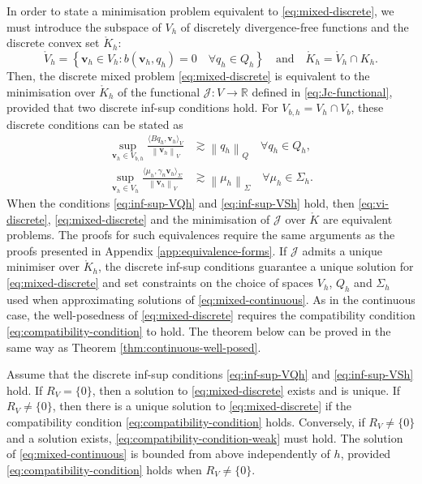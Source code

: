 \documentclass[onefignum,onetabnum]{siamart190516}
\newcommand{\RR}{\mathbb{R}}
\newcommand{\bv}{\boldsymbol{v}}
\newcommand{\nrm}[1]{\left\lVert#1\right\rVert}
\newcommand{\Vo}{\mathring{V}}
\newcommand{\Ko}{\mathring{K}}
\newcommand{\Jc}{\mathcal{J}}
\begin{document}
In order to state a minimisation problem equivalent to \eqref{eq:mixed-discrete}, we must introduce the subspace of $V_h$ of discretely divergence-free functions and the discrete convex set $\Ko_h$:
%
\[
	\Vo_h = \left\lbrace \bv_h \in V_h : b(\bv_h,q_h) = 0 \quad \forall q_h\in Q_h \right\rbrace \quad \text{and} \quad \Ko_h = \Vo_h \cap K_h.
\]
%
Then, the discrete mixed problem \eqref{eq:mixed-discrete} is equivalent to the minimisation over $\Ko_h$ of the functional $\Jc:V \to \RR$ defined in \eqref{eq:Jc-functional}, provided that two discrete inf-sup conditions hold. For $V_{b,h} = V_h \cap V_b$, these discrete conditions can be stated as 
%
\begin{align}
	\sup_{\bv_h\in V_{b,h}} \frac{\langle Bq_h, \bv_h\rangle_V}{\nrm{\bv_h}_V} & \gtrsim \nrm{q_h}_Q \quad \forall q_h\in Q_h, \label{eq:inf-sup-VQh}\\
	\sup_{\bv_h\in V_{h}} \frac{\langle \mu_h, \gamma_n\bv_h\rangle_\Sigma}{\nrm{\bv_h}_V} &\gtrsim \nrm{\mu_h}_\Sigma \quad \forall \mu_h\in \Sigma_h. \label{eq:inf-sup-VSh}
\end{align}
%
When the conditions \eqref{eq:inf-sup-VQh} and \eqref{eq:inf-sup-VSh} hold, then \eqref{eq:vi-discrete}, \eqref{eq:mixed-discrete} and the minimisation of $\Jc$ over $\Ko$ are equivalent problems. The proofs for such equivalences require the same arguments as the proofs presented in Appendix \ref{app:equivalence-forms}. If $\Jc$ admits a unique minimiser over $\Ko_h$, the discrete inf-sup conditions guarantee a unique solution for \eqref{eq:mixed-discrete} and set constraints on the choice of spaces $V_h$, $Q_h$ and $\Sigma_h$ used when approximating solutions of \eqref{eq:mixed-continuous}. As in the continuous case, the well-posedness of \eqref{eq:mixed-discrete} requires the compatibility condition \eqref{eq:compatibility-condition} to hold. The theorem below can be proved in the same way as Theorem \ref{thm:continuous-well-posed}.

\begin{theorem}\label{thm:discrete-well-posed}
	Assume that the discrete inf-sup conditions \eqref{eq:inf-sup-VQh} and \eqref{eq:inf-sup-VSh} hold. If $R_V = \{0\}$, then a solution to \eqref{eq:mixed-discrete} exists and is unique. If $R_V \neq \{0\}$, then there is a unique solution to \eqref{eq:mixed-discrete} if the compatibility condition \eqref{eq:compatibility-condition} holds. Conversely, if $R_V \neq \{0\}$ and a solution exists, \eqref{eq:compatibility-condition-weak} must hold. The solution of \eqref{eq:mixed-continuous} is bounded from above independently of $h$, provided \eqref{eq:compatibility-condition} holds when $R_V \neq \{0\}$.
\end{theorem}
\end{document}
